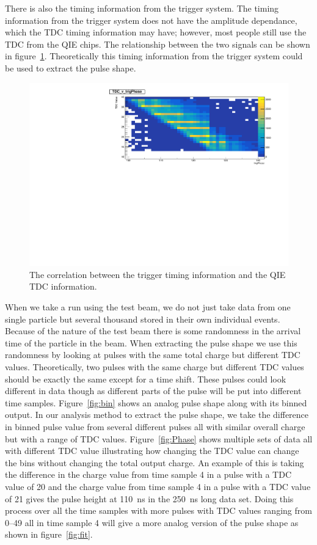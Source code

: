 There is also the timing information from the trigger system. The timing information from the trigger system does not have the amplitude dependance, which the TDC timing information may have; however, most people still use the TDC from the QIE chips. The relationship between the two signals can be shown in figure~\ref{fig:tdc}. Theoretically this timing information from the trigger system could be used to extract the pulse shape.

\begin{figure}
\centering
\includegraphics[width=\linewidth]{Figures/TDCvTrigPhase.pdf}
\caption{The correlation between the trigger timing information and the QIE TDC information.}
\label{fig:tdc}
\end{figure}

When we take a run using the test beam, we do not just take data from one single particle but several thousand stored in their own individual events. Because of the nature of the test beam there is some randomness in the arrival time of the particle in the beam. When extracting the pulse shape we use this randomness by looking at pulses with the same total charge but different TDC values. Theoretically, two pulses with the same charge but different TDC values should be exactly the same except for a time shift. These pulses could look different in data though as different parts of the pulse will be put into different time samples. Figure~\ref{fig:bin} shows an analog pulse shape along with its binned output. In our analysis method to extract the pulse shape, we take the difference in binned pulse value from several different pulses all with similar overall charge but with a range of TDC values. Figure~\ref{fig:Phase} shows multiple sets of data all with different TDC value illustrating how changing the TDC value can change the bins without changing the total output charge. An example of this is taking the difference in the charge value from time sample 4 in a pulse with a TDC value of 20 and the charge value from time sample 4 in a pulse with a TDC value of 21 gives the pulse height at 110~ns in the 250~ns long data set. Doing this process over all the time samples with more pulses with TDC values ranging from 0--49 all in time sample 4 will give a more analog version of the pulse shape as shown in figure~\ref{fig:fit}.

